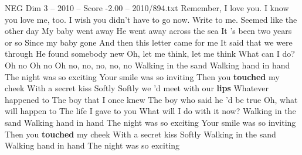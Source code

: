 \begin{textsample}{NEG Dim 3 – 2010 – Score -2.00 – 2010/894.txt}  \label{ex:f3_neg_021}
Remember, I love you.
I know you love me, too.
I wish you didn't have to go now.
Write to me.
Seemed like the other day My baby went away He went away across the sea It 's been two years or so Since my baby gone And then this letter came for me It said that we were through He found somebody new Oh, let me think, let me think What can I do?
Oh no Oh no Oh no, no, no, no, no Walking in the sand Walking hand in hand The night was so exciting Your smile was so inviting Then you \textbf{touched} my cheek With a secret kiss Softly Softly we 'd meet with our \textbf{lips} Whatever happened to The boy that I once knew The boy who said he 'd be true Oh, what will happen to The life I gave to you What will I do with it now?
Walking in the sand Walking hand in hand The night was so exciting Your smile was so inviting Then you \textbf{touched} my cheek With a secret kiss Softly Walking in the sand Walking hand in hand The night was so exciting

\end{textsample}
